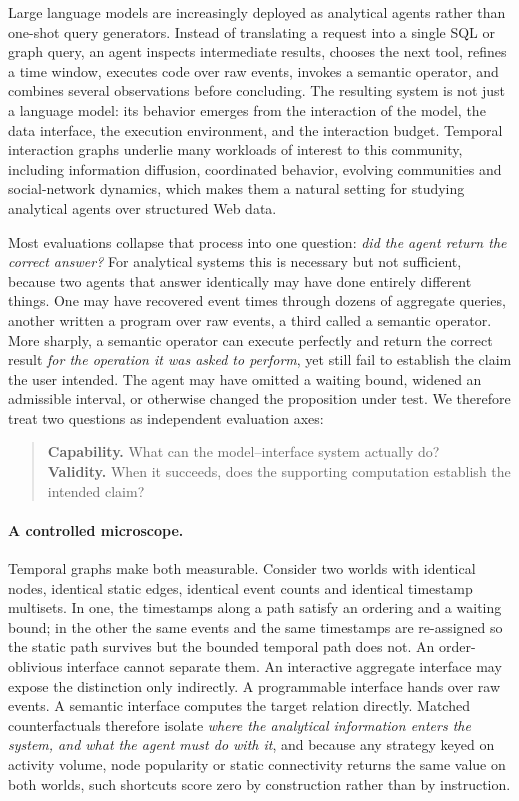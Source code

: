 \documentclass[sigconf,anonymous,review]{acmart}
\begin{document}
Large language models are increasingly deployed as analytical agents rather than one-shot query
generators. Instead of translating a request into a single SQL or graph query, an agent inspects
intermediate results, chooses the next tool, refines a time window, executes code over raw events,
invokes a semantic operator, and combines several observations before concluding. The resulting
system is not just a language model: its behavior emerges from the interaction of the model, the
data interface, the execution environment, and the interaction budget. Temporal interaction graphs
underlie many workloads of interest to this community, including information diffusion, coordinated
behavior, evolving communities and social-network dynamics, which makes them a natural setting for
studying analytical agents over structured Web data.

Most evaluations collapse that process into one question: \emph{did the agent return the correct
answer?} For analytical systems this is necessary but not sufficient, because two agents that
answer identically may have done entirely different things. One may have recovered event times
through dozens of aggregate queries, another written a program over raw events, a third called a
semantic operator. More sharply, a semantic operator can execute perfectly and return the correct
result \emph{for the operation it was asked to perform}, yet still fail to establish the claim the
user intended. The agent may have omitted a waiting bound, widened an admissible interval, or
otherwise changed the proposition under test. We therefore treat two questions as independent
evaluation axes:

\begin{quote}
\textbf{Capability.} What can the model--interface system actually do?\\
\textbf{Validity.} When it succeeds, does the supporting computation establish the intended claim?
\end{quote}

\paragraph{A controlled microscope.}
Temporal graphs make both measurable. Consider two worlds with identical nodes, identical static
edges, identical event counts and identical timestamp multisets. In one, the timestamps along a
path satisfy an ordering and a waiting bound; in the other the same events and the same timestamps
are re-assigned so the static path survives but the bounded temporal path does not. An
order-oblivious interface cannot separate them. An interactive aggregate interface may expose the
distinction only indirectly. A programmable interface hands over raw events. A semantic interface
computes the target relation directly. Matched counterfactuals therefore isolate \emph{where the
analytical information enters the system, and what the agent must do with it}, and because any
strategy keyed on activity volume, node popularity or static connectivity returns the same value on
both worlds, such shortcuts score zero by construction rather than by instruction.
\end{document}
